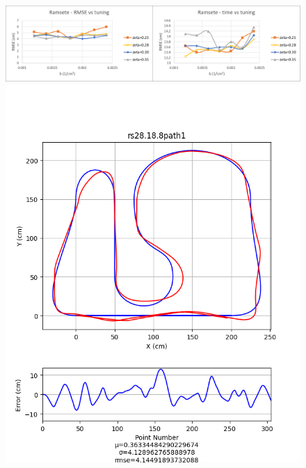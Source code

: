 \documentclass[12pt]{article}
\begin{document}
\begin{flushleft}
\begin{figure}[H]
\includegraphics[width=\linewidth]{images/tuningGraphs/rs}
\includegraphics[width=\linewidth]{images/pathData/rspath1}
\endminipage\hfill
{}

\end{figure}
\end{flushleft}
\end{document}

